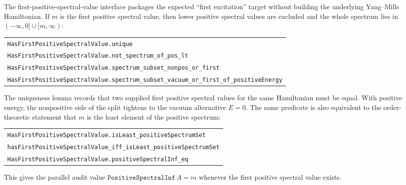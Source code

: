 \documentclass[11pt]{article}
\newcommand{\lean}[1]{\texttt{#1}}
\newcommand{\leansmall}[1]{{\small\texttt{#1}}}
\begin{document}
The first-positive-spectral-value interface packages the expected “first
excitation” target without building the underlying Yang--Mills Hamiltonian.
If \(m\) is the first positive spectral value, then lower positive spectral
values are excluded and the whole spectrum lies in
\((-\infty,0]\cup[m,\infty)\):
\begin{center}
\begin{tabular}{l}
\leansmall{HasFirstPositiveSpectralValue.unique}\\
\leansmall{HasFirstPositiveSpectralValue.not\_spectrum\_of\_pos\_lt}\\
\leansmall{HasFirstPositiveSpectralValue.spectrum\_subset\_nonpos\_or\_first}\\
\leansmall{HasFirstPositiveSpectralValue.spectrum\_subset\_vacuum\_or\_first\_of\_positiveEnergy}
\end{tabular}
\end{center}
The uniqueness lemma records that two supplied first positive spectral values
for the same Hamiltonian must be equal.  With positive energy, the nonpositive
side of the split tightens to the vacuum alternative \(E=0\).
The same predicate is also equivalent to the order-theoretic statement that
\(m\) is the least element of the positive spectrum:
\begin{center}
\begin{tabular}{l}
\leansmall{HasFirstPositiveSpectralValue.isLeast\_positiveSpectrumSet}\\
\leansmall{hasFirstPositiveSpectralValue\_iff\_isLeast\_positiveSpectrumSet}\\
\leansmall{HasFirstPositiveSpectralValue.positiveSpectralInf\_eq}
\end{tabular}
\end{center}
This gives the parallel audit value
\(\lean{PositiveSpectralInf}\,A=m\) whenever the first positive spectral value
exists.
\end{document}
